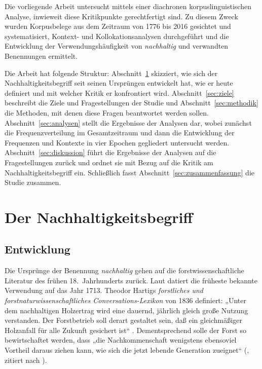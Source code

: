 \documentclass[
    german,
    a4paper,%
    12pt,%
    oneside,%
    toc=bibliography,
    final,
]{scrartcl}
\begin{document}
Die vorliegende Arbeit untersucht mittels einer diachronen korpuslinguistischen Analyse, inwieweit diese Kritikpunkte gerechtfertigt sind. Zu diesem Zweck wurden Korpusbelege aus dem Zeitraum von 1776 bis 2016 gesichtet und systematisiert, Kontext- und Kollokationsanalysen durchgeführt und die Entwicklung der Verwendungshäufigkeit von \textit{nachhaltig} und verwandten Benennungen ermittelt.

Die Arbeit hat folgende Struktur: Abschnitt~\ref{sec:entwicklung-definition} skizziert, wie sich der Nachhaltigkeitsbegriff seit seinen Ursprüngen entwickelt hat, wie er heute definiert und mit welcher Kritik er konfrontiert wird. Abschnitt~\ref{sec:ziele} beschreibt die Ziele und Fragestellungen der Studie und Abschnitt~\ref{sec:methodik} die Methoden, mit denen diese Fragen beantwortet werden sollen. Abschnitt~\ref{sec:analysen} stellt die Ergebnisse der Analysen dar, wobei zunächst die Frequenzverteilung im Gesamtzeitraum und dann die Entwicklung der Frequenzen und Kontexte in vier Epochen gegliedert untersucht werden. Abschnitt~\ref{sec:diskussion} führt die Ergebnisse der Analysen auf die Fragestellungen zurück und ordnet sie mit Bezug auf die Kritik am Nachhaltigkeitsbegriff ein. Schließlich fasst Abschnitt~\ref{sec:zusammenfassung} die Studie zusammen.

\section{Der Nachhaltigkeitsbegriff}
\label{sec:entwicklung-definition}

\subsection{Entwicklung}
\label{subsec:entwicklung}

Die Ursprünge der Benennung \textit{nachhaltig} gehen auf die forstwissenschaftliche Literatur des frühen 18.~Jahrhunderts zurück. Laut \citet[99]{Zürcher1965} datiert die früheste bekannte Verwendung auf das Jahr 1713. Theodor Hartigs \textit{forstliches und forstnaturwissenschaftliches Conversations-Lexikon} von 1836 definiert: „Unter dem nachhaltigen Holzertrag wird eine dauernd, jährlich gleich große Nutzung verstanden. Der Forstbetrieb soll derart gestaltet sein, daß ein gleichmäßiger Holzanfall für alle Zukunft gesichert ist“ \citep[zitiert nach][100]{Zürcher1965}. Dementsprechend solle der Forst so bewirtschaftet werden, dass „die Nachkommenschaft wenigstens ebensoviel Vortheil daraus ziehen kann, wie sich die jetzt lebende Generation zueignet“ (\citealt[1]{Hartig1804}, zitiert nach \citealt[7]{OhlmeierBrunold2015}).
\end{document}
